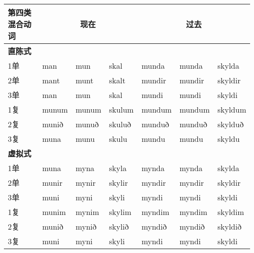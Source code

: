 \begin{longtable}{llll|lll}
    \toprule
    第四类混合动词  & \multicolumn{3}{c}{现在} & \multicolumn{3}{c}{过去}                                                    \\
    \midrule
    \endhead
    \bottomrule
    \endfoot
    \textbf{直陈式} & ~                        & ~                        & \multicolumn{1}{c}{} & ~      & ~      & ~       \\
    1单             & man                      & mun                      & skal                 & munda  & munda  & skylda  \\
    2单             & mant                     & munt                     & skalt                & mundir & mundir & skyldir \\
    3单             & man                      & mun                      & skal                 & mundi  & mundi  & skyldi  \\
    1复             & munum                    & munum                    & skulum               & mundum & mundum & skyldum \\
    2复             & munið                    & munuð                    & skuluð               & munduð & munduð & skylduð \\
    3复             & muna                     & munu                     & skulu                & mundu  & mundu  & skyldu  \\
    \textbf{虚拟式} & ~                        & ~                        & \multicolumn{1}{c}{} & ~      & ~      & ~       \\
    1单             & muna                     & myna                     & skyla                & mynda  & mynda  & skylda  \\
    2单             & munir                    & mynir                    & skylir               & myndir & myndir & skyldir \\
    3单             & muni                     & myni                     & skyli                & myndi  & myndi  & skyldi  \\
    1复             & munim                    & mynim                    & skylim               & myndim & myndim & skyldim \\
    2复             & munið                    & mynið                    & skylið               & myndið & myndið & skyldið \\
    3复             & muni                     & myni                     & skyli                & myndi  & myndi  & skyldi  \\

\end{longtable}
